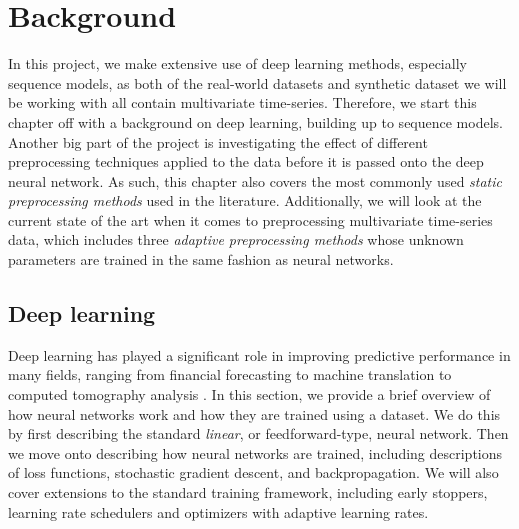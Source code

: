 \documentclass{statsmsc}
\begin{document}
{%


\chapter{Background} %


In this project, we make extensive use of deep learning methods, especially sequence models, as
both of the real-world datasets and synthetic dataset we will be working with all contain
multivariate time-series.  Therefore, we start this chapter off with a background on deep
learning, building up to sequence models.
Another big part of the project is investigating the effect of different
preprocessing techniques applied to the data before it is passed onto the deep neural network.
As such, this chapter also covers the most commonly used \textit{static preprocessing methods} used
in the literature. Additionally, we will look at the current state of the art when it comes
to preprocessing multivariate time-series data, which includes three
\textit{adaptive preprocessing methods} whose unknown parameters are trained in the same
fashion as neural networks.


\section{Deep learning}%
\label{sec:Deep learning}

Deep learning has played a significant role in improving predictive performance in many fields,
ranging from financial forecasting \citep{dain,rdain,bin} to machine
translation \citep{gru_cho,attention} to computed tomography analysis
\citep{mixture_ct}. In this section, we provide a brief overview of how neural networks work and
how they are trained using a dataset. We do this by first describing the standard \textit{linear},
or feedforward-type, neural network. Then we move onto describing how neural networks are trained,
including descriptions of loss functions, stochastic gradient descent, and backpropagation. We will
also cover extensions to the standard training framework, including early stoppers, learning
rate schedulers and optimizers with adaptive learning rates.

}
\end{document}
